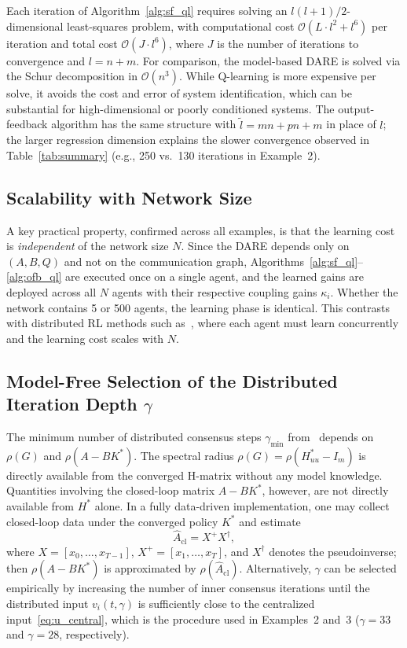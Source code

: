 \documentclass[12pt]{elsarticle}
\theoremstyle{remark}
\begin{document}
Each iteration of Algorithm~\ref{alg:sf_ql} requires solving an $l(l+1)/2$-dimensional least-squares problem, with computational cost $\mathcal{O}(L \cdot l^2 + l^6)$ per iteration and total cost $\mathcal{O}(J \cdot l^6)$, where $J$ is the number of iterations to convergence and $l = n+m$. For comparison, the model-based DARE is solved via the Schur decomposition in $\mathcal{O}(n^3)$. While Q-learning is more expensive per solve, it avoids the cost and error of system identification, which can be substantial for high-dimensional or poorly conditioned systems. The output-feedback algorithm has the same structure with $\tilde{l} = mn+pn+m$ in place of $l$; the larger regression dimension explains the slower convergence observed in Table~\ref{tab:summary} (e.g., 250 vs.\ 130 iterations in Example~2).

\subsection{Scalability with Network Size}
\label{subsec:scalability}

A key practical property, confirmed across all examples, is that the learning cost is \emph{independent} of the network size $N$. Since the DARE depends only on $(A,B,Q)$ and not on the communication graph, Algorithms~\ref{alg:sf_ql}--\ref{alg:ofb_ql} are executed once on a single agent, and the learned gains are deployed across all $N$ agents with their respective coupling gains $\kappa_i$. Whether the network contains 5 or 500 agents, the learning phase is identical. This contrasts with distributed RL methods such as~\cite{zhang2011}, where each agent must learn concurrently and the learning cost scales with $N$.

\subsection{Model-Free Selection of the Distributed Iteration Depth $\gamma$}
\label{subsec:gamma}

The minimum number of distributed consensus steps $\gamma_{\min}$ from~\cite[Thm.~3.4]{cacace2024} depends on $\rho(G)$ and $\rho(A - BK^*)$. The spectral radius $\rho(G) = \rho(H_{uu}^* - I_m)$ is directly available from the converged H-matrix without any model knowledge. Quantities involving the closed-loop matrix $A - BK^*$, however, are not directly available from $H^*$ alone. In a fully data-driven implementation, one may collect closed-loop data under the converged policy $K^*$ and estimate
\begin{equation}
\hat{A}_{\mathrm{cl}} = X^+ X^\dagger,
\label{eq:Acl}
\end{equation}
where $X = [x_0, \ldots, x_{T-1}]$, $X^+ = [x_1, \ldots, x_T]$, and $X^\dagger$ denotes the pseudoinverse; then $\rho(A - BK^*)$ is approximated by $\rho(\hat{A}_{\mathrm{cl}})$. Alternatively, $\gamma$ can be selected empirically by increasing the number of inner consensus iterations until the distributed input $v_i(t,\gamma)$ is sufficiently close to the centralized input~\eqref{eq:u_central}, which is the procedure used in Examples~2 and~3 ($\gamma = 33$ and $\gamma = 28$, respectively).
\end{document}
